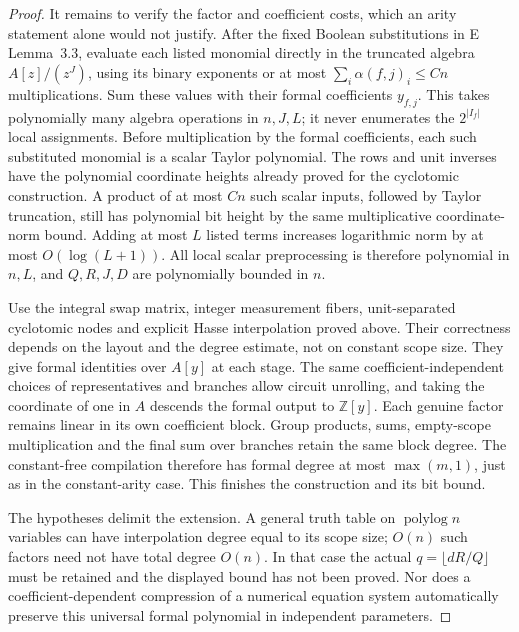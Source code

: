 \begin{proof}
It remains to verify the factor and coefficient costs,
which an arity statement alone would not justify.  After
the fixed Boolean substitutions in E Lemma~3.3, evaluate
each listed monomial directly in the truncated algebra
$A[z]/(z^J)$, using its binary exponents or at most
$\sum_i\alpha(f,j)_i\le Cn$ multiplications.  Sum these
values with their formal coefficients $y_{f,j}$.
This takes polynomially many algebra operations in
$n,J,L$; it never enumerates the $2^{|I_f|}$ local
assignments.  Before multiplication by the formal
coefficients, each such substituted monomial is a
scalar Taylor polynomial.  The rows and unit inverses
have the polynomial coordinate heights already proved
for the cyclotomic construction.  A product of at most
$Cn$ such scalar inputs, followed by Taylor truncation,
still has polynomial bit height by the same multiplicative
coordinate-norm bound.  Adding at most $L$ listed terms
increases logarithmic norm by at most $O(\log(L+1))$.
All local scalar preprocessing is therefore polynomial
in $n,L$, and $Q,R,J,D$ are polynomially bounded in $n$.

Use the integral swap matrix, integer measurement fibers,
unit-separated cyclotomic nodes and explicit Hasse
interpolation proved above.  Their correctness depends on
the layout and the degree estimate, not on constant scope
size.  They give formal identities over $A[y]$ at each
stage.  The same coefficient-independent choices of
representatives and branches allow circuit unrolling,
and taking the coordinate of one in $A$ descends the
formal output to $\mathbb Z[y]$.  Each genuine factor
remains linear in its own coefficient block.  Group
products, sums, empty-scope multiplication and the final
sum over branches retain the same block degree.  The
constant-free compilation therefore has formal degree
at most $\max(m,1)$, just as in the constant-arity case.
This finishes the construction and its bit bound.

The hypotheses delimit the extension.  A general truth
table on $\operatorname{polylog} n$ variables can have
interpolation degree equal to its scope size; $O(n)$ such
factors need not have total degree $O(n)$.  In that case
the actual $q=\lfloor dR/Q\rfloor$ must be retained and
the displayed bound has not been proved.  Nor does a
coefficient-dependent compression of a numerical equation
system automatically preserve this universal formal
polynomial in independent parameters.


\end{proof}
